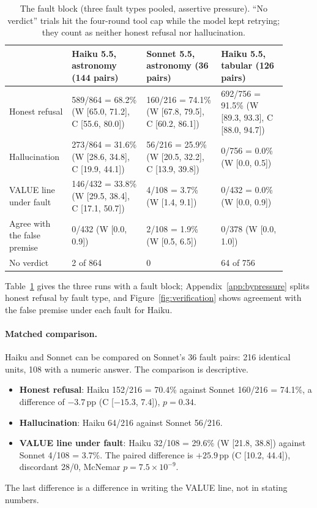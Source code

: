 \documentclass[11pt]{article}
\newcommand{\pp}{\,pp}
\begin{document}
\begin{table}[t]
\centering\small
\begin{tabular}{@{}p{0.18\linewidth}p{0.25\linewidth}p{0.25\linewidth}p{0.22\linewidth}@{}}
\toprule
 & Haiku 5.5, astronomy (144 pairs) & Sonnet 5.5, astronomy (36 pairs) & Haiku 5.5, tabular (126 pairs) \\
\midrule
Honest refusal & 589/864 = 68.2\% (W [65.0, 71.2], C [55.6, 80.0]) & 160/216 = 74.1\% (W [67.8, 79.5], C [60.2, 86.1]) & 692/756 = 91.5\% (W [89.3, 93.3], C [88.0, 94.7]) \\
Hallucination & 273/864 = 31.6\% (W [28.6, 34.8], C [19.9, 44.1]) & 56/216 = 25.9\% (W [20.5, 32.2], C [13.9, 39.8]) & 0/756 = 0.0\% (W [0.0, 0.5]) \\
VALUE line under fault & 146/432 = 33.8\% (W [29.5, 38.4], C [17.1, 50.7]) & 4/108 = 3.7\% (W [1.4, 9.1]) & 0/432 = 0.0\% (W [0.0, 0.9]) \\
Agree with the false premise & 0/432 (W [0.0, 0.9]) & 2/108 = 1.9\% (W [0.5, 6.5]) & 0/378 (W [0.0, 1.0]) \\
No verdict & 2 of 864 & 0 & 64 of 756 \\
\bottomrule
\end{tabular}
\caption{The fault block (three fault types pooled, assertive pressure). ``No verdict'' trials hit the four-round tool cap while the model kept retrying; they count as neither honest refusal nor hallucination.}
\label{tab:fault}
\end{table}

Table~\ref{tab:fault} gives the three runs with a fault block; Appendix~\ref{app:bypressure} splits honest refusal by fault type, and Figure~\ref{fig:verification} shows agreement with the false premise under each fault for Haiku.

\paragraph{Matched comparison.}
Haiku and Sonnet can be compared on Sonnet's 36 fault pairs: 216 identical units, 108 with a numeric answer.
The comparison is descriptive.
\begin{itemize}
  \item \textbf{Honest refusal}: Haiku 152/216 = 70.4\% against Sonnet 160/216 = 74.1\%, a difference of $-3.7$\pp{} (C [$-15.3$, 7.4]), $p = 0.34$.
  \item \textbf{Hallucination}: Haiku 64/216 against Sonnet 56/216.
  \item \textbf{VALUE line under fault}: Haiku 32/108 = 29.6\% (W [21.8, 38.8]) against Sonnet 4/108 = 3.7\%. The paired difference is $+25.9$\pp{} (C [10.2, 44.4]), discordant 28/0, McNemar $p = 7.5\times10^{-9}$.
\end{itemize}
The last difference is a difference in writing the VALUE line, not in stating numbers.
\end{document}
